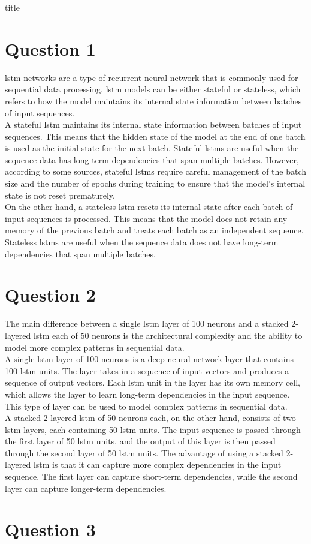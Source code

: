 \documentclass[12pt]{article}
\begin{document}
{title}

\tableofcontents


\section{Question 1}
\gls{lstm} networks are a type of recurrent neural network that is commonly used for sequential data processing. \gls{lstm} models can be either stateful or stateless, which refers to how the model maintains its internal state information between batches of input sequences. \\
A stateful \gls{lstm} maintains its internal state information between batches of input sequences. This means that the hidden state of the model at the end of one batch is used as the initial state for the next batch. Stateful \glspl{lstm} are useful when the sequence data has long-term dependencies that span multiple batches. However, according to some sources, stateful \glspl{lstm} require careful management of the batch size and the number of epochs during training to ensure that the model's internal state is not reset prematurely. \\
On the other hand, a stateless \gls{lstm} resets its internal state after each batch of input sequences is processed. This means that the model does not retain any memory of the previous batch and treats each batch as an independent sequence. Stateless \glspl{lstm} are useful when the sequence data does not have long-term dependencies that span multiple batches.

\section{Question 2}
The main difference between a single \gls{lstm} layer of 100 neurons and a stacked 2-layered \gls{lstm} each of 50 neurons is the architectural complexity and the ability to model more complex patterns in sequential data. \\
A single \gls{lstm} layer of 100 neurons is a deep neural network layer that contains 100 \gls{lstm} units. The layer takes in a sequence of input vectors and produces a sequence of output vectors. Each \gls{lstm} unit in the layer has its own memory cell, which allows the layer to learn long-term dependencies in the input sequence. This type of layer can be used to model complex patterns in sequential data. \\
A stacked 2-layered \gls{lstm} of 50 neurons each, on the other hand, consists of two \gls{lstm} layers, each containing 50 \gls{lstm} units. The input sequence is passed through the first layer of 50 \gls{lstm} units, and the output of this layer is then passed through the second layer of 50 \gls{lstm} units. The advantage of using a stacked 2-layered \gls{lstm} is that it can capture more complex dependencies in the input sequence. The first layer can capture short-term dependencies, while the second layer can capture longer-term dependencies.

\section{Question 3}
\end{document}
